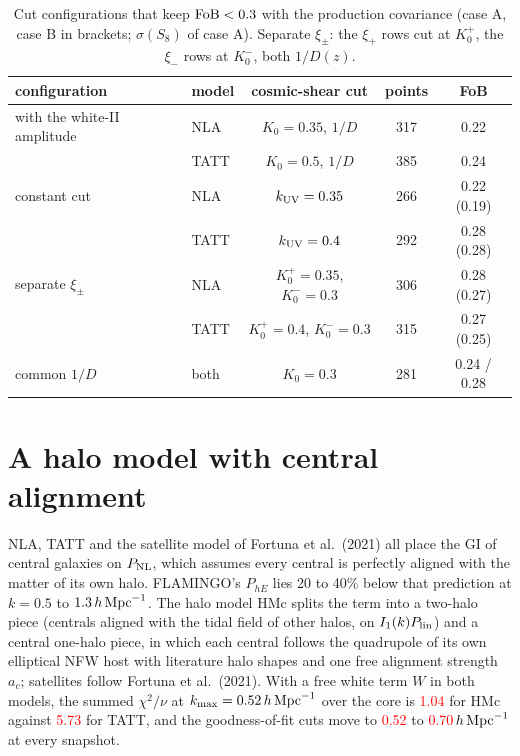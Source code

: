 \documentclass[11pt]{article}
\newcommand{\hMpc}{\,h\,{\rm Mpc}^{-1}}
\newcommand{\kmax}{k_{\rm max}}
\newcommand{\kuv}{k_{\rm UV}}
\newcommand{\FoB}{{\rm FoB}}
\newcommand{\PNL}{P_{\rm NL}}
\newif\ifnumbersfinal
\newcommand{\refresh}[1]{\ifnumbersfinal#1\else\textcolor{red}{#1}\fi}
\newcommand{\HMcChi}{\refresh{1.04}}
\newcommand{\HMcTATTChi}{\refresh{5.73}}
\newcommand{\HMcCutLo}{\refresh{0.52}}
\newcommand{\HMcCutHi}{\refresh{0.70}}
\begin{document}
\begin{table}[tbp]
  \centering
  \small
  \caption{Cut configurations that keep $\FoB < 0.3$ with the
    production covariance (case A, case B in brackets; $\sigma(S_8)$ of
    case A). Separate $\xi_\pm$: the $\xi_+$ rows cut at $K_0^+$, the
    $\xi_-$ rows at $K_0^-$, both $1/D(z)$.}
  \label{tab:rec}
  \begin{tabular}{llccc}
    \toprule
    configuration & model & cosmic-shear cut & points & FoB \\
    \midrule
    with the white-II amplitude & NLA & $K_0 = 0.35$, $1/D$ & 317 & 0.22 \\
     & TATT & $K_0 = 0.5$, $1/D$ & 385 & 0.24 \\
    constant cut & NLA & $\kuv = 0.35$ & 266 & 0.22 (0.19) \\
     & TATT & $\kuv = 0.4$ & 292 & 0.28 (0.28) \\
    separate $\xi_\pm$ & NLA & $K_0^+ = 0.35$, $K_0^- = 0.3$ & 306 & 0.28 (0.27) \\
     & TATT & $K_0^+ = 0.4$, $K_0^- = 0.3$ & 315 & 0.27 (0.25) \\
    common $1/D$ & both & $K_0 = 0.3$ & 281 & 0.24 / 0.28 \\
    \bottomrule
  \end{tabular}
\end{table}

\section{A halo model with central alignment}
\label{sec:hmc}

NLA, TATT and the satellite model of Fortuna et al.\ (2021) all place
the GI of central galaxies on $\PNL$, which assumes every central is
perfectly aligned with the matter of its own halo. FLAMINGO's $P_{hE}$
lies 20 to 40\% below that prediction at $k = 0.5$ to $1.3\hMpc$. The
halo model HMc splits the term into a two-halo piece (centrals aligned
with the tidal field of other halos, on $I_1(k)P_{\rm lin}$) and a
central one-halo piece, in which each central follows the quadrupole of
its own elliptical NFW host with literature halo shapes and one free
alignment strength $a_c$; satellites follow Fortuna et al.\ (2021). With a
free white term $W$ in both models, the summed $\chi^2/\nu$ at $\kmax =
0.52\hMpc$ over the core is \HMcChi{} for HMc against \HMcTATTChi{}
for TATT, and the goodness-of-fit cuts move to \HMcCutLo{} to
\HMcCutHi$\hMpc$ at every snapshot.
\end{document}
